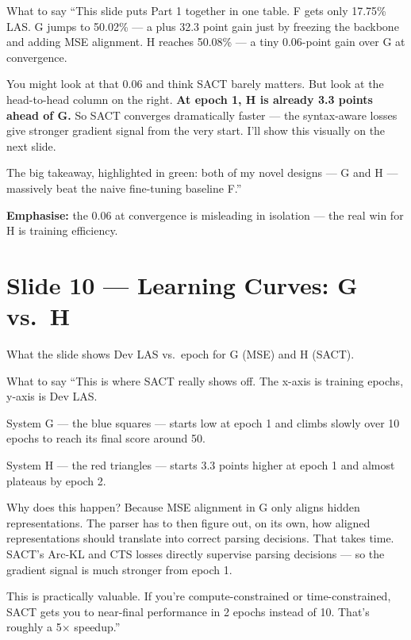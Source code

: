 \documentclass[11pt]{article}
\begin{document}
\begin{pitchbox}{What to say}
``This slide puts Part 1 together in one table. F gets only 17.75\% LAS. G jumps to 50.02\% --- a plus 32.3 point gain just by freezing the backbone and adding MSE alignment. H reaches 50.08\% --- a tiny 0.06-point gain over G at convergence.

You might look at that 0.06 and think SACT barely matters. But look at the head-to-head column on the right. \textbf{At epoch 1, H is already 3.3 points ahead of G.} So SACT converges dramatically faster --- the syntax-aware losses give stronger gradient signal from the very start. I'll show this visually on the next slide.

The big takeaway, highlighted in green: both of my novel designs --- G and H --- massively beat the naive fine-tuning baseline F.''
\end{pitchbox}

\begin{tipbox}
\textbf{Emphasise:} the 0.06 at convergence is misleading in isolation --- the real win for H is training efficiency.
\end{tipbox}

\section{Slide 10 --- Learning Curves: G vs.\ H}

\begin{pitchbox}{What the slide shows}
Dev LAS vs.\ epoch for G (MSE) and H (SACT).
\end{pitchbox}

\begin{pitchbox}{What to say}
``This is where SACT really shows off. The x-axis is training epochs, y-axis is Dev LAS.

System G --- the blue squares --- starts low at epoch 1 and climbs slowly over 10 epochs to reach its final score around 50.

System H --- the red triangles --- starts 3.3 points higher at epoch 1 and almost plateaus by epoch 2.

Why does this happen? Because MSE alignment in G only aligns hidden representations. The parser has to then figure out, on its own, how aligned representations should translate into correct parsing decisions. That takes time. SACT's Arc-KL and CTS losses directly supervise parsing decisions --- so the gradient signal is much stronger from epoch 1.

This is practically valuable. If you're compute-constrained or time-constrained, SACT gets you to near-final performance in 2 epochs instead of 10. That's roughly a 5$\times$ speedup.''
\end{pitchbox}
\end{document}
